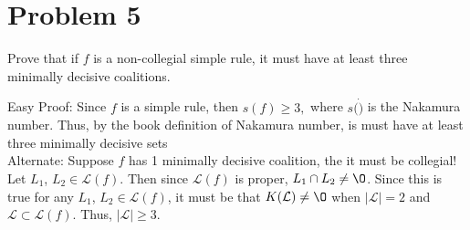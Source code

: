 \documentclass[11pt]{article}
\renewcommand{\emptyset}{\O}
\begin{document}
\newpage
\section*{Problem 5}
\begin{problem}
    Prove that if $f$ is a non-collegial simple rule, it must have at least three minimally decisive coalitions.
\end{problem}
\begin{solution}
Easy Proof: Since $f$ is a simple rule, then $s(f)\geq 3,$ where $s(\dot)$ is the Nakamura number. Thus, by the book definition of Nakamura number, is must have at least three minimally decisive sets\\

Alternate: Suppose $f$ has 1 minimally decisive coalition, the it must be collegial! Let $L_1$, $L_2 \in \mathcal{L}(f)$.
Then since $\mathcal{L}(f)$ is proper, $L_1 \cap L_2 \neq \emptyset$. Since this is true for
any $L_1$, $L_2 \in \mathcal{L}(f)$, it must be that $K(\mathcal{L}) \neq \emptyset$ when $|\mathcal{L}| = 2$ and $\mathcal{L}\subset \mathcal{L}(f).$ Thus, $|\mathcal{L}|\geq 3.$
\end{solution}

\newpage
\end{document}
